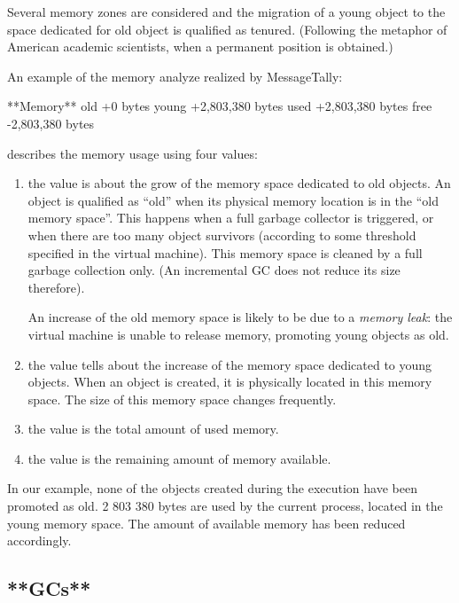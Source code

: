 \documentclass[a4paper,10pt,twoside]{book}
\begin{document}
Several memory zones are considered and the migration of a young object to the space dedicated for old object is qualified as tenured. (Following the metaphor of American academic scientists, when a permanent position is obtained.)

An example of the memory analyze realized by MessageTally: 

\begin{code}
**Memory**
	old			+0 bytes
	young		+2,803,380 bytes
	used		+2,803,380 bytes
	free		-2,803,380 bytes
\end{code}

 describes the memory usage using four values:

\begin{enumerate}

\item the  value is about the grow of the memory space dedicated to old objects. An object is qualified as ``old'' when its physical memory location is in the ``old memory space''. This happens when a full garbage collector is triggered, or when there are too many object survivors (according to some threshold specified in the virtual machine). This memory space is cleaned by a full garbage collection only. (An incremental GC does not reduce its size therefore). 

An increase of the old memory space is likely to be due to a \emph{memory leak}: the virtual machine is unable to release memory, promoting young objects as old.

\item the  value tells about the increase of the memory space dedicated to young objects. When an object is created, it is physically located in this memory space. The size of this memory space changes frequently. 

\item the  value is the total amount of used memory.

\item the  value is the remaining amount of memory available.
\end{enumerate}

In our example, none of the objects created during the execution have been promoted as old. 2 803 380 bytes are used by the current process, located in the young memory space. The amount of available memory has been reduced accordingly.

\subsection{**GCs**}
\end{document}
